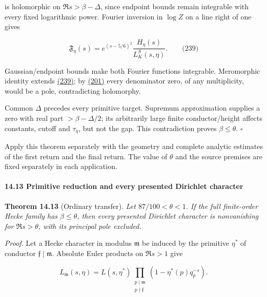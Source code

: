 is holomorphic on \(\Re s>\beta-\Delta\), since endpoint bounds remain integrable with every fixed logarithmic power. Fourier inversion in \(\log Z\) on a line right of one gives

\hypertarget{dr:Mellin-identity}{}

\label{dr:Mellin-identity}

\[
\mathfrak F_\eta(s)=e^{(s-5/6)^2}
                      \frac{H_\eta(s)}{L_K^S(s,\eta)}.
 \qquad\text{(239)}
\]

Gaussian/endpoint bounds make both Fourier functions integrable. Meromorphic identity extends \protect\hyperlink{dr:Mellin-identity}{(239)}; by \protect\hyperlink{dr:H-nonzero}{(201)} every denominator zero, of any multiplicity, would be a pole, contradicting holomorphy.

Common \(\Delta\) precedes every primitive target. Supremum approximation supplies a zero with real part \(>\beta-\Delta/2\); its arbitrarily large finite conductor/height affects constants, cutoff and \(\tau_\eta\), but not the gap. This contradiction proves \(\beta\le\theta\). \(\square\)

Apply this theorem separately with the geometry and complete analytic estimates of the first return and the final return. The value of \(\theta\) and the source premises are fixed separately in each application.

\hypertarget{dr:ordinary-transfer}{}

\label{dr:ordinary-transfer}

\hypertarget{primitive-reduction-and-every-presented-dirichlet-character}{%
\paragraph{14.13 Primitive reduction and every presented Dirichlet character}\label{primitive-reduction-and-every-presented-dirichlet-character}}

\textbf{Theorem 14.13} (Ordinary transfer).
\emph{Let \(87/100<\theta<1\). If the full finite-order Hecke family
has \(\beta\le\theta\), then every presented Dirichlet character is
nonvanishing for \(\Re s>\theta\), with its principal pole excluded.}

\emph{Proof.} Let a Hecke character in modulus \(\mathfrak m\) be induced by the primitive \(\eta^*\) of conductor \(\mathfrak f\mid\mathfrak m\). Absolute Euler products on \(\Re s>1\) give

\[
L_{\mathfrak m}(s,\eta)=L(s,\eta^*)
 \prod_{\substack{p\mid\mathfrak m\\p\nmid\mathfrak f}}
                 (1-\eta^*(p)q_p^{-s}).
\]

